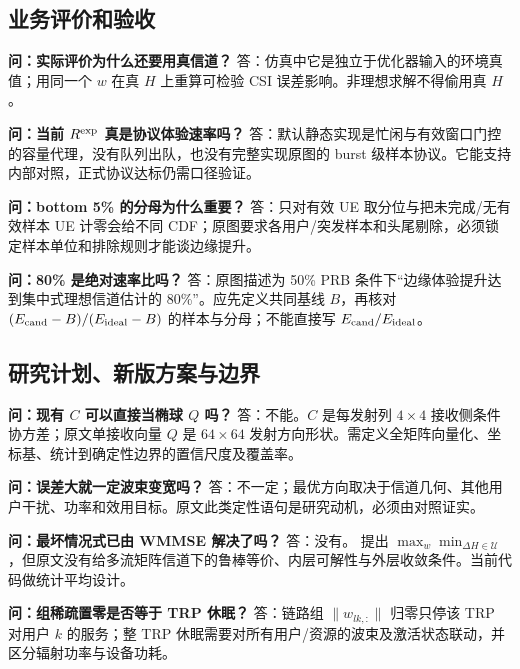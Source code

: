 \documentclass[11pt,a4paper]{ctexart}
\begin{document}
\subsection*{业务评价和验收}

\textbf{问：实际评价为什么还要用真信道？} 答：仿真中它是独立于优化器输入的环境真值；用同一个 $w$ 在真 $H$ 上重算可检验 CSI 误差影响。非理想求解不得偷用真 $H$。\par

\textbf{问：当前 $R^{\rm exp}$ 真是协议体验速率吗？} 答：默认静态实现是忙闲与有效窗口门控的容量代理，没有队列出队，也没有完整实现原图的 burst 级样本协议。它能支持内部对照，正式协议达标仍需口径验证。\par

\textbf{问：bottom 5\% 的分母为什么重要？} 答：只对有效 UE 取分位与把未完成/无有效样本 UE 计零会给不同 CDF；原图要求各用户/突发样本和头尾剔除，必须锁定样本单位和排除规则才能谈边缘提升。\par

\textbf{问：80\% 是绝对速率比吗？} 答：原图描述为 50\% PRB 条件下“边缘体验提升达到集中式理想信道估计的 80\%”。应先定义共同基线 $B$，再核对 $(E_{\rm cand}-B)/(E_{\rm ideal}-B)$ 的样本与分母；不能直接写 $E_{\rm cand}/E_{\rm ideal}$。\par

\subsection*{研究计划、新版方案与边界}

\textbf{问：现有 $C$ 可以直接当椭球 $Q$ 吗？} 答：不能。$C$ 是每发射列 $4\times4$ 接收侧条件协方差；原文单接收向量 $Q$ 是 $64\times64$ 发射方向形状。需定义全矩阵向量化、坐标基、统计到确定性边界的置信尺度及覆盖率。\par

\textbf{问：误差大就一定波束变宽吗？} 答：不一定；最优方向取决于信道几何、其他用户干扰、功率和效用目标。原文此类定性语句是研究动机，必须由对照证实。\par

\textbf{问：最坏情况式已由 WMMSE 解决了吗？} 答：没有。 提出 $\max_w\min_{\Delta H\in\mathcal U}$，但原文没有给多流矩阵信道下的鲁棒等价、内层可解性与外层收敛条件。当前代码做统计平均设计。\par

\textbf{问：组稀疏置零是否等于 TRP 休眠？} 答：链路组 $\|w_{lk,:}\|$ 归零只停该 TRP 对用户 $k$ 的服务；整 TRP 休眠需要对所有用户/资源的波束及激活状态联动，并区分辐射功率与设备功耗。\par
\end{document}
